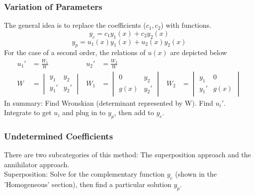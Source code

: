 \documentclass{article}
\begin{document}
    \subsubsection{Variation of Parameters}
        The general idea is to replace the coefficients ($c_1,c_2$) with functions. 
        $$y_c=c_1y_1(x)+c_2y_2(x)$$
        $$y_p=u_1(x)y_1(x)+u_2(x)y_2(x)$$
        For the case of a second order, the relations of $u(x)$ are depicted below
        \begin{align*}
            u_1'&=\frac{W_1}{W} & u_2'&=\frac{W_2}{W}\\[0.7 cm]
            W&=
            \begin{vmatrix}
            y_1 & y_2 \\
            y_1'& y_2'
            \end{vmatrix}
            &
            W_1&=
            \begin{vmatrix}
            0 & y_2 \\
            g(x)& y_2'
            \end{vmatrix}
            &
            W_2&=
            \begin{vmatrix}
            y_1 & 0 \\
            y_1'& g(x)
            \end{vmatrix}
        \end{align*}
        In summary: Find Wronskian (determinant represented by W). Find $u_i'$. Integrate to get $u_i$ and plug in to $y_p$, then add to $y_c$.

    \subsubsection{Undetermined Coefficients}
        There are two subcategories of this method: The superposition approach and the annihilator approach.\\
        Superposition: Solve for the complementary function $y_c$ (shown in the 'Homogeneous' section), then find a particular solution $y_p$.
\end{document}
